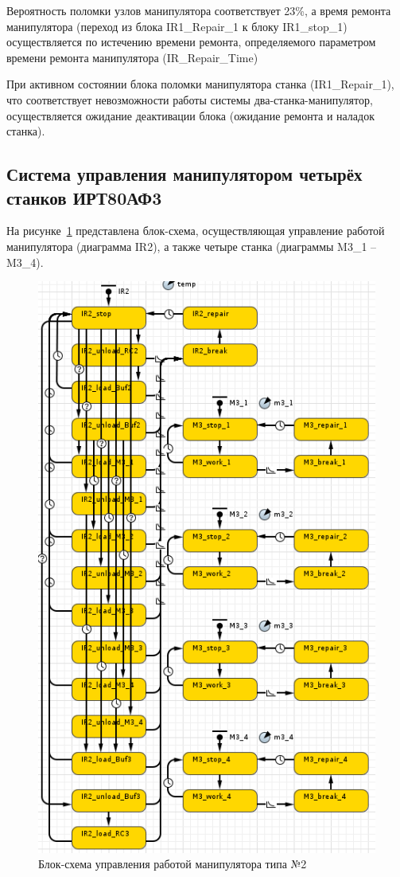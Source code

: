 Вероятность поломки узлов манипулятора соответствует 23\%, а время ремонта манипулятора (переход из блока IR1\_Repair\_1 к блоку IR1\_stop\_1) осуществляется по истечению времени ремонта, определяемого параметром времени ремонта манипулятора (IR\_Repair\_Time)

При активном состоянии блока поломки манипулятора станка (IR1\_Repair\_1), что соответствует невозможности работы системы два-станка-манипулятор, осуществляется ожидание деактивации блока (ожидание ремонта и наладок станка).

\subsection{Система управления манипулятором четырёх станков ИРТ80АФ3}

На рисунке~\ref{fig:ir2} представлена блок-схема, осуществляющая управление работой манипулятора (диаграмма IR2), а также четыре станка (диаграммы M3\_1 -- M3\_4).

\begin{figure}
    \includegraphics[height=\textheight]{Figures/ir2.png}
    \caption{Блок-схема управления работой манипулятора типа №2}
    \label{fig:ir2}
\end{figure}

